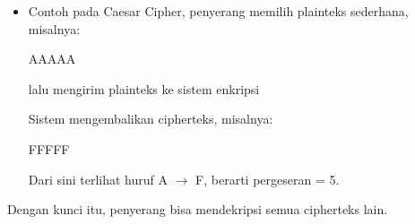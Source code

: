 \documentclass{article}
\begin{document}

\begin{itemize}
  \item Contoh pada Caesar Cipher, penyerang memilih plainteks sederhana, misalnya:
  
  AAAAA
  
  lalu mengirim plainteks ke sistem enkripsi
  
  Sistem mengembalikan cipherteks, misalnya:
  
  FFFFF
  
  Dari sini terlihat huruf A $\rightarrow$ F, berarti pergeseran = 5.
\end{itemize}

Dengan kunci itu, penyerang bisa mendekripsi semua cipherteks lain.
\end{document}
